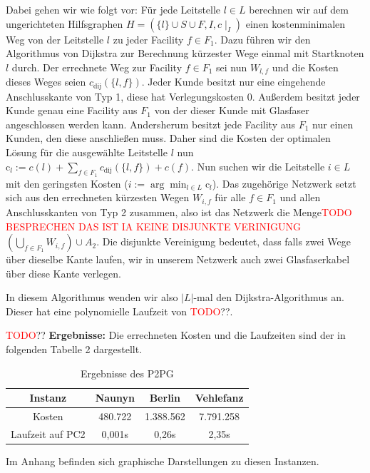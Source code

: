 \documentclass[11pt,a4paper]{article}
\newcommand{\TODO}{\textcolor{red}{TODO}}
\theoremstyle{my_th_style1}
\begin{document}
Dabei gehen wir wie folgt vor:
Für jede Leitstelle $ l \in L$ berechnen wir auf dem ungerichteten Hilfsgraphen $H=(\{l\} \cup S \cup F , I,c\mid_I)$ einen kostenminimalen Weg von der Leitstelle $l$ zu jeder Facility $f \in F_1$. Dazu führen wir den Algorithmus von Dijkstra zur Berechnung k\"urzester Wege einmal mit Startknoten $l$ durch.
Der errechnete Weg zur Facility \( f \in F_1\) sei nun $W_{l,f}$ und die Kosten dieses Weges seien $c_{\text{dij}}(\{l,f\})$. 
Jeder Kunde besitzt nur eine eingehende Anschlusskante von Typ 1, diese hat Verlegungskosten 0. 
Außerdem besitzt jeder Kunde genau eine Facility aus $F_1$ von der dieser Kunde mit Glasfaser angeschlossen werden kann. 
Andersherum besitzt jede Facility aus $F_1$ nur einen Kunden, den diese anschließen muss. 
Daher sind die Kosten der optimalen Lösung für die ausgewählte Leitstelle $l$ nun $\text{c}_l:=c(l) + \displaystyle\sum_{f \in F_1} c_{\text{dij}}(\{l,f\}) + c(f)$. 
Nun suchen wir die Leitstelle $i \in L$ mit den geringsten Kosten ($i:=\arg \displaystyle\min_{l \in L} \text{c}_l$). Das zugehörige Netzwerk setzt sich aus den errechneten kürzesten Wegen $W_{i,f}$ für alle $f \in F_1$ und allen Anschlusskanten von Typ 2 zusammen, also ist das Netzwerk die Menge\textcolor{red}{TODO BESPRECHEN DAS IST IA KEINE DISJUNKTE VERINIGUNG} $(\bigcup_{f \in F_1 }W_{i,f}) \cup A_2 $. Die disjunkte Vereinigung bedeutet, dass falls zwei Wege über dieselbe Kante laufen, wir in unserem Netzwerk auch zwei Glasfaserkabel über diese Kante verlegen.

In diesem Algorithmus wenden wir also $|L|$-mal den Dijkstra-Algorithmus an. Dieser hat eine polynomielle Laufzeit von \TODO??. 

\TODO??
\textbf{Ergebnisse:} Die errechneten Kosten und die Laufzeiten sind der in folgenden Tabelle 2 dargestellt.
\begin{table}[h]
	\centering
	\begin{tabular}{c|c|c|c}
		 Instanz & Naunyn & Berlin & Vehlefanz \\	
		\hline
		Kosten & 480.722 & 1.388.562 & 7.791.258 \\
		Laufzeit auf PC2 & 0,001s & 0,26s & 2,35s\\
	\end{tabular}
	\label{P2PG}
	\caption{Ergebnisse des P2PG} 
\end{table}
Im Anhang befinden sich graphische Darstellungen zu diesen Instanzen.
\end{document}
